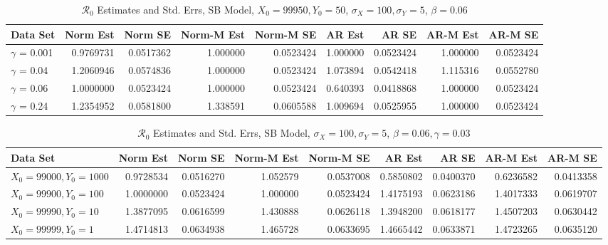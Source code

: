 \documentclass[12pt]{article}
\newcommand{\rr}{\ensuremath{\mathcal{R}_0}}
\begin{document}
\begin{table}[H]
	
	\caption{\label{tab:}$\rr$ Estimates and Std. Errs, SB Model,
		$X_0 = 99950, Y_0 = 50$, $\sigma_X = 100, \sigma_Y = 5$, $\beta = 0.06$}
	\centering
	\begin{footnotesize}
	\begin{tabular}[t]{l|r|r|r|r|r|r|r|r}
		\hline
		Data Set & Norm Est & Norm SE & Norm-M Est & Norm-M SE & AR Est & AR SE & AR-M Est & AR-M SE\\
		\hline
		$\gamma$ = 0.001 & 0.9769731 & 0.0517362 & 1.000000 & 0.0523424 & 1.000000 & 0.0523424 & 1.000000 & 0.0523424\\
		\hline
		$\gamma$ = 0.04 & 1.2060946 & 0.0574836 & 1.000000 & 0.0523424 & 1.073894 & 0.0542418 & 1.115316 & 0.0552780\\
		\hline
		$\gamma$ = 0.06 & 1.0000000 & 0.0523424 & 1.000000 & 0.0523424 & 0.640393 & 0.0418868 & 1.000000 & 0.0523424\\
		\hline
		$\gamma$ = 0.24 & 1.2354952 & 0.0581800 & 1.338591 & 0.0605588 & 1.009694 & 0.0525955 & 1.000000 & 0.0523424\\
		\hline
	\end{tabular}
\end{footnotesize}
\end{table}


\begin{table}[H]
	
	\caption{\label{tab:}$\rr$ Estimates and Std. Errs, SB Model,
		$\sigma_X = 100, \sigma_Y = 5$, $\beta = 0.06, \gamma = 0.03$}
	\centering
	\begin{footnotesize}
		\begin{tabular}[t]{l|r|r|r|r|r|r|r|r}
			\hline
			Data Set & Norm Est & Norm SE & Norm-M Est & Norm-M SE & AR Est & AR SE & AR-M Est & AR-M SE\\
			\hline
			$X_0 = 99000, Y_0 = 1000$ & 0.9728534 & 0.0516270 & 1.052579 & 0.0537008 & 0.5850802 & 0.0400370 & 0.6236582 & 0.0413358\\
			\hline
			$X_0 = 99900, Y_0 = 100$ & 1.0000000 & 0.0523424 & 1.000000 & 0.0523424 & 1.4175193 & 0.0623186 & 1.4017333 & 0.0619707\\
			\hline
			$X_0 = 99990, Y_0 = 10$ & 1.3877095 & 0.0616599 & 1.430888 & 0.0626118 & 1.3948200 & 0.0618177 & 1.4507203 & 0.0630442\\
			\hline
			$X_0 = 99999, Y_0 = 1$ & 1.4714813 & 0.0634938 & 1.465728 & 0.0633695 & 1.4665442 & 0.0633871 & 1.4723265 & 0.0635120\\
			\hline
		\end{tabular}
	\end{footnotesize}
\end{table}
\end{document}
